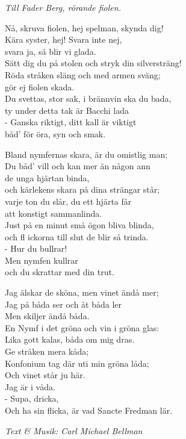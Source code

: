 {\footnotesize\textit{Till Fader Berg, rörande fiolen.}}\par
\vspace{10pt}
Nå, skruva fiolen, hej spelman, skynda dig!\\
Kära syster, hej! Svara inte nej,\\
svara ja, så blir vi glada.\\
Sätt dig du på stolen och stryk din silversträng!\\
Röda stråken släng och med armen sväng;\\
gör ej fiolen skada.\\
Du svettas, stor sak, i brännvin ska du bada,\\
ty under detta tak är Bacchi lada\\
- Ganska riktigt, ditt kall är viktigt\\
båd' för öra, syn och smak.\par
\vspace{10pt}
Bland nymfernas skara, är du omistlig man;\\
Du båd’ vill och kan mer än någon ann\\
de unga hjärtan binda,\\
och kärlekens skara på dina strängar står;\\
varje ton du slår, du ett hjärta får\\
att konstigt sammanlinda.\\
Just på en minut små ögon bliva blinda,\\
och fl ickorna till slut de blir så trinda.\\
- Hur du bullrar!\\
Men nymfen kullrar\\
och du skrattar med din trut.\par
\newpage
Jag älskar de sköna, men vinet ändå mer;\\
Jag på båda ser och åt båda ler\\
Men skiljer ändå båda.\\
En Nymf i det gröna och vin i gröna glas:\\
Lika gott kalas, båda om mig dras.\\
Ge stråken mera kåda;\\
Konfonium tag där uti min gröna låda;\\
Och vinet står ju här.\\
Jag är i våda.\\
- Supa, dricka,\\
Och ha sin flicka, är vad Sancte Fredman lär.\par
\vspace{10pt}
{\footnotesize\textit{Text \& Musik: Carl Michael Bellman}}
